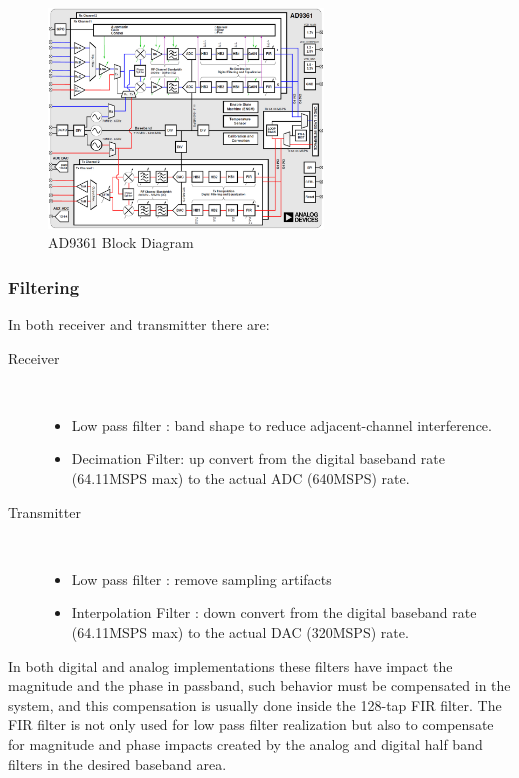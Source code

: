 \begin{figure}[htbp]
    \centering
    \includegraphics[width=0.65\textwidth]{./figures/ad9361_block_diagram}
    \caption{ AD9361 Block Diagram
    \label{fig:ad9361blk}}
\end{figure}

\subsubsection{Filtering}

In both receiver and transmitter there are:
\begin{description}
	\item[Receiver] \hfill \\
	\begin{itemize}
		\item Low pass filter : band shape to reduce adjacent-channel interference.
		\item Decimation Filter: up convert from the digital baseband rate (64.11MSPS max) to the actual ADC (640MSPS) rate.
	\end{itemize}
	\item[Transmitter] \hfill \\
\begin{itemize}
		\item Low pass filter : remove sampling artifacts
		\item Interpolation Filter : down convert from the digital baseband rate (64.11MSPS max) to the actual DAC (320MSPS) rate.
	\end{itemize}
\end{description}

In both digital and analog implementations these filters have impact the magnitude and the phase in passband, such behavior must be compensated in the system, and this compensation is usually done inside the 128-tap FIR filter. The FIR filter is not only used for low pass filter realization but also to compensate for magnitude and phase impacts created by the analog and digital half band filters in the desired baseband area.

